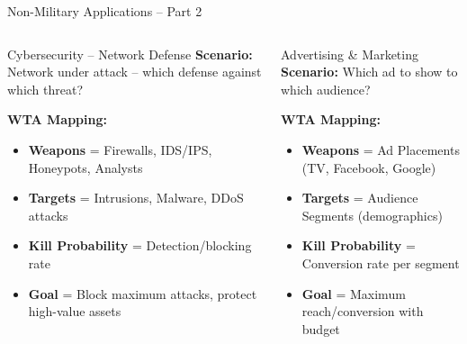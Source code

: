 \documentclass[aspectratio=43,8pt]{beamer}
\begin{document}
\begin{frame}{Non-Military Applications -- Part 2}
\begin{columns}[t]
\begin{exampleblock}{Cybersecurity -- Network Defense}
\textbf{Scenario:} Network under attack -- which defense against which threat?

\vspace{0.2cm}
\textbf{WTA Mapping:}
\begin{itemize}
    \item \textbf{Weapons} = Firewalls, IDS/IPS, Honeypots, Analysts
    \item \textbf{Targets} = Intrusions, Malware, DDoS attacks
    \item \textbf{Kill Probability} = Detection/blocking rate
    \item \textbf{Goal} = Block maximum attacks, protect high-value assets
\end{itemize}
\end{exampleblock}

\begin{alertblock}{Advertising \& Marketing}
\textbf{Scenario:} Which ad to show to which audience?

\vspace{0.2cm}
\textbf{WTA Mapping:}
\begin{itemize}
    \item \textbf{Weapons} = Ad Placements (TV, Facebook, Google)
    \item \textbf{Targets} = Audience Segments (demographics)
    \item \textbf{Kill Probability} = Conversion rate per segment
    \item \textbf{Goal} = Maximum reach/conversion with budget
\end{itemize}
\end{alertblock}
\end{columns}
\end{frame}
\end{document}
